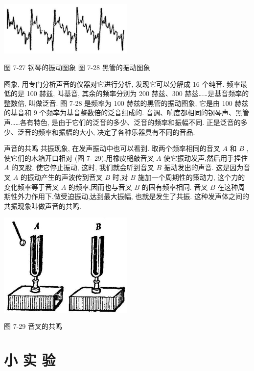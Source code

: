 \documentclass[10pt]{article}
\begin{document}
\begin{center}
\includegraphics[max width=0.5\textwidth]{images/01912d55-147c-70aa-b0e0-1782a122f948_222_976749.jpg}
\end{center}

图 7-27 钢琴的振动图象 图 7-28 黑管的振动图象

图象, 用专门分析声音的仪器对它进行分析, 发现它可以分解成 16 个纯音. 频率最低的是 100 赫兹, 叫基音, 其余的频率分别为 200 赫兹、300 赫兹……是基音频率的整数倍, 叫做泛音. 图 7-28 是频率为 100 赫兹的黑管的振动图象, 它是由 100 赫兹的基音和 9 个频率为基音整数倍的泛音组成的. 音调、响度都相同的钢琴声、黑管声……各有特色, 是由于它们的泛音的多少、泛音的频率和振幅不同. 正是泛音的多少、泛音的频率和振幅的大小, 决定了各种乐器具有不同的音品.

声音的共鸣 共振现象, 在发声振动中也可以看到. 取两个频率相同的音叉 \(A\) 和 \(B\) ,使它们的木箱开口相对 (图 7- 29),用橡皮槌敲音叉 \(A\) 使它振动发声,然后用手捏住 \(A\) 的叉股, 使它停止振动, 这时, 我们就会听到音叉 \(B\) 振动发出的声音. 这是因为音叉 \(A\) 的振动产生的声波传到音叉 \(B\) 时,对 \(B\) 施加一个周期性的策动力, 这个力的变化频率等于音叉 \(A\) 的频率,因而也与音叉 \(B\) 的固有频率相同. 音叉 \(B\) 在这种周期性外力作用下,做受迫振动,达到最大振幅, 也就是发生了共振. 这种发声体之间的共振现象叫做声音的共鸣.

\begin{center}
\includegraphics[max width=0.5\textwidth]{images/01912d55-147c-70aa-b0e0-1782a122f948_223_632304.jpg}
\end{center}

图 7-29 音叉的共鸣

\section*{小 实 验}
\end{document}
